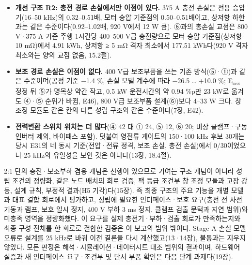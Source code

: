 \begin{itemize}
\begin{itemize}
\item \textbf{개선 구조 R2: 충전 경로 손실에서만 이점이 있다.} 375 A 충전 손실은 전용 승압기(16–50 kHz)의 0.32–0.51배, 모터 승압 기준점의 0.50–0.51배이고, 상저항 하한과는 같은 수준이다(0.92–1.02배, 920 V에서 12 W 큼). ⑥과의 총손실 교점은 800 V·375 A 기준 주행 1시간당 400–500 V급 충전량으로 모터 승압 기준점(상저항 10 mΩ)에서 4.91 kWh, 상저항 ≥ 5 mΩ 격자 최소에서 177.51 kWh다(920 V 격자 최소와는 양의 교점 없음, 15.2절).
\item \textbf{보조 경로 손실은 이점이 없다.} 400 V급 보조부품을 쓰는 기존 방식(⑤·①)과 같은 수준이며(공정 기준 −1.4 \%, 손실 모델 계수에 따라 −26.5 … +10.0 \%; E\textsubscript{oss} 정정 뒤 ⑤가 명목상 약간 작고, 0.5 kW 운전시간의 약 0.94 \%p만 23 kW로 옮겨도 ④·⑤ 순위가 바뀜, E46), 800 V급 보조부품 설계(⑥)보다 4–33 W 크다. 창 조정 모듈도 같은 칸의 다른 성립 구조와 같은 수준이다(7장, E42).
\item \textbf{전력변환 스위치 위치는 더 많다}(④ 42 대 ① 24, ⑤ 12, ⑥ 20; 비상 클램프·구동 인버터 제외, 바이패스 포함). 덧붙여 영전류 게이트의 150·100 kHz 후보 30개는 당시 E31의 네 동시 기준(전압·전류 정격, 보조 손실, 충전 손실)에서 0/30이었으나 25 kHz의 유일성을 보인 것은 아니다(13장, 18.4절).
\end{itemize}
\end{itemize}

2:1 단의 충전·보조부하 겸용 개념은 선행이 있으므로 기여는 구조 개념이 아니라 성립 조건의 정량화, 같은 노드 배치의 회로 검증, 팩 등급 조건부 창 조정 모듈과 고장 강등, 설계 규칙, 부정적 결과(H5 기각)다(15장). 즉 최종 구조의 주요 기능을 개별 모델과 대표 결합 회로에서 평가하고, 성립에 필요한 인터페이스·보호 요구(충전 전 사전 기동과 램프, 보호 일시 정지, 400 V 부하 3 ms 정지, 클램프 검출 문턱과 지연 범위)와 미충족 영역을 정량화했다. 이 요구를 실제 충전기·부하·검출 회로가 만족하는지와 최종 구성 전체를 한 회로로 결합한 검증은 이 보고의 범위 밖이다. Stage A 손실 모델 오류로 설계를 25 kHz로 바꿔 이전 결론을 다시 계산했고(13·14장), 불통과는 지우지 않았다. 모든 판정은 해석·시뮬레이션·데이터시트 대조 범위의 결과이며, 하드웨어 실증과 새 인터페이스 요구·조건부 및 단서 부품 확인은 다음 단계 과제다(19장).
